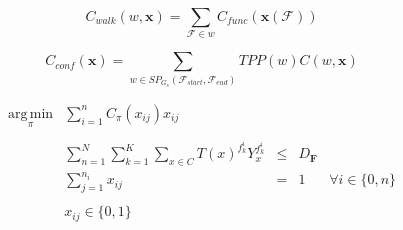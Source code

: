 \begin{equation}
	C_{walk}(w, \textbf{x}) = \sum_{\mathscr{F} \in w} C_{func}(\textbf{x}(\mathscr{F}))
\end{equation}


\begin{equation}
	C_{conf}(\textbf{x}) = \sum_{w \in SP_{G_s}(\mathscr{F}_{start}, \mathscr{F}_{end})} TPP(w) C(w, \textbf{x})
\end{equation}


\begin{equation}
\begin{array} {lllrrr} 
\displaystyle \operatorname*{arg\,min}_\pi & \displaystyle\sum_{i = 1}^n C_{\pi}(x_{ij})x_{ij} \\\\
& \displaystyle\sum_{n = 1}^N \sum_{k = 1}^K \sum_{x \in C} T(x)^{f_k^i} Y_x^{f_k^i} & \leq &  D_{\textbf{F}} \\
& \displaystyle\sum_{j = 1}^{n_i} x_{ij} & = & 1 & \forall i \in \lbrace 0, n \rbrace \\\\
& x_{ij} \in \lbrace 0, 1 \rbrace &&
\end{array}
\end{equation}
















